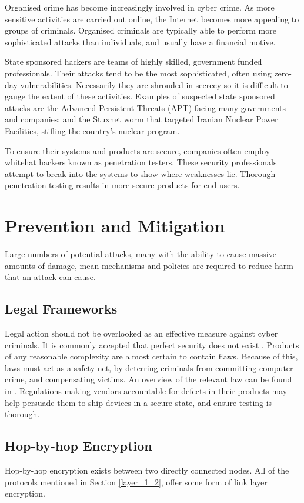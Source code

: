 \documentclass[10pt,journal,compsoc]{IEEEtran}
\begin{document}
Organised crime has become increasingly involved in cyber crime. As more
sensitive activities are carried out online, the Internet becomes more
appealing to groups of criminals. Organised criminals are typically able to
perform more sophisticated attacks than individuals, and usually have a
financial motive. 

State sponsored hackers are teams of highly skilled, government funded
professionals. Their attacks tend to be the most sophisticated, often using
zero-day vulnerabilities. Necessarily they are shrouded in secrecy so it is
difficult to gauge the extent of these activities. Examples of suspected state
sponsored attacks are the Advanced Persistent Threats (APT) facing many
governments and companies; and the Stuxnet worm that targeted Iranian Nuclear
Power Facilities, stifling the country's nuclear program.  

To ensure their systems and products are secure, companies often employ
whitehat hackers known as penetration testers. These security professionals
attempt to break into the systems to show where weaknesses lie. Thorough
penetration testing results in more secure products for end users.

\section{Prevention and Mitigation}
Large numbers of potential attacks, many with the ability to cause massive
amounts of damage, mean mechanisms and policies are required to reduce harm
that an attack can cause. 

\subsection{Legal Frameworks}
Legal action should not be overlooked as an effective measure against cyber
criminals. It is commonly accepted that perfect security does not exist
\cite{ThereMustBeA}. Products of any reasonable complexity are almost certain
to contain flaws. Because of this, laws must act as a safety net, by deterring
criminals from committing computer crime, and compensating victims. An overview
of the relevant law can be found in \cite{Weber2010}.  Regulations making
vendors accountable for defects in their products may help persuade them to
ship devices in a secure state, and ensure testing is thorough. 

\subsection{Hop-by-hop Encryption}
Hop-by-hop encryption exists between two directly connected nodes. All of the
protocols mentioned in Section \ref{layer_1_2}, offer some form of link layer
encryption. 
\end{document}
